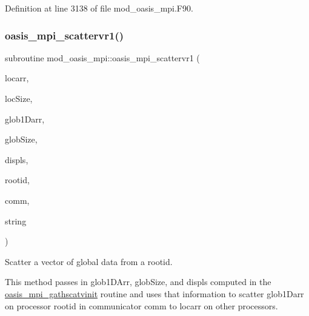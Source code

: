 Definition at line 3138 of file mod\+\_\+oasis\+\_\+mpi.\+F90.

\mbox{\label{namespacemod__oasis__mpi_a9d0d807b92d39c9789eea4744d331612}} 
\subsubsection{\texorpdfstring{oasis\+\_\+mpi\+\_\+scattervr1()}{oasis\_mpi\_scattervr1()}}
{\footnotesize\ttfamily subroutine mod\+\_\+oasis\+\_\+mpi\+::oasis\+\_\+mpi\+\_\+scattervr1 (\begin{DoxyParamCaption}\item[{real(ip\+\_\+double\+\_\+p), dimension(\+:), intent(out)}]{locarr,  }\item[{integer(ip\+\_\+i4\+\_\+p), intent(in)}]{loc\+Size,  }\item[{real(ip\+\_\+double\+\_\+p), dimension(\+:), intent(in)}]{glob1\+Darr,  }\item[{integer(ip\+\_\+i4\+\_\+p), dimension(\+:), intent(in)}]{glob\+Size,  }\item[{integer(ip\+\_\+i4\+\_\+p), dimension(\+:), intent(in)}]{displs,  }\item[{integer(ip\+\_\+i4\+\_\+p), intent(in)}]{rootid,  }\item[{integer(ip\+\_\+i4\+\_\+p), intent(in)}]{comm,  }\item[{character($\ast$), intent(in), optional}]{string }\end{DoxyParamCaption})\hspace{0.3cm}{\ttfamily [private]}}



Scatter a vector of global data from a rootid. 

This method passes in glob1\+D\+Arr, glob\+Size, and displs computed in the \hyperlink{interfacemod__oasis__mpi_1_1oasis__mpi__gathscatvinit}{oasis\+\_\+mpi\+\_\+gathscatvinit} routine and uses that information to scatter glob1\+Darr on processor rootid in communicator comm to locarr on other processors.


